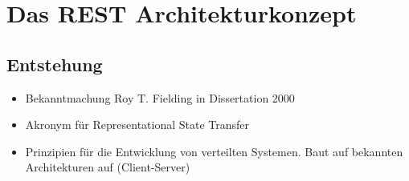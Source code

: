 \section{Das REST Architekturkonzept}
\subsection{Entstehung}
\begin{itemize}
  \item Bekanntmachung Roy T. Fielding in Dissertation 2000
  \item Akronym für Representational State Transfer
  \item Prinzipien für die Entwicklung von verteilten Systemen. Baut auf bekannten Architekturen auf (Client-Server)
\end{itemize}

